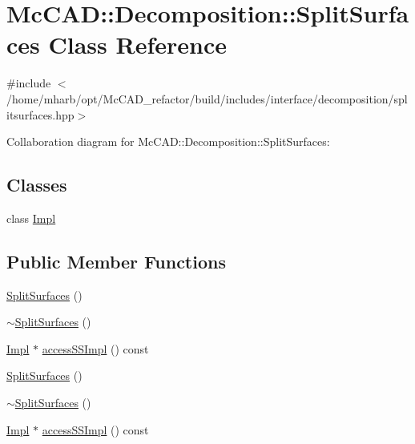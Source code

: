 \hypertarget{classMcCAD_1_1Decomposition_1_1SplitSurfaces}{}\section{Mc\+C\+AD\+:\+:Decomposition\+:\+:Split\+Surfaces Class Reference}
\label{classMcCAD_1_1Decomposition_1_1SplitSurfaces}


{\ttfamily \#include $<$/home/mharb/opt/\+Mc\+C\+A\+D\+\_\+refactor/build/includes/interface/decomposition/splitsurfaces.\+hpp$>$}



Collaboration diagram for Mc\+C\+AD\+:\+:Decomposition\+:\+:Split\+Surfaces\+:
\subsection*{Classes}
\begin{DoxyCompactItemize}
\item 
class \hyperlink{classMcCAD_1_1Decomposition_1_1SplitSurfaces_1_1Impl}{Impl}
\end{DoxyCompactItemize}
\subsection*{Public Member Functions}
\begin{DoxyCompactItemize}
\item 
\hyperlink{classMcCAD_1_1Decomposition_1_1SplitSurfaces_af0b06b75edbe1c2c45c2d8a3259b9985}{Split\+Surfaces} ()
\item 
\hyperlink{classMcCAD_1_1Decomposition_1_1SplitSurfaces_af963eef101d51ba4a0b1f112f29c5aa8}{$\sim$\+Split\+Surfaces} ()
\item 
\hyperlink{classMcCAD_1_1Decomposition_1_1SplitSurfaces_1_1Impl}{Impl} $\ast$ \hyperlink{classMcCAD_1_1Decomposition_1_1SplitSurfaces_a3b6480dcdde196aff297ded78b5391fc}{access\+S\+S\+Impl} () const
\item 
\hyperlink{classMcCAD_1_1Decomposition_1_1SplitSurfaces_af0b06b75edbe1c2c45c2d8a3259b9985}{Split\+Surfaces} ()
\item 
\hyperlink{classMcCAD_1_1Decomposition_1_1SplitSurfaces_af963eef101d51ba4a0b1f112f29c5aa8}{$\sim$\+Split\+Surfaces} ()
\item 
\hyperlink{classMcCAD_1_1Decomposition_1_1SplitSurfaces_1_1Impl}{Impl} $\ast$ \hyperlink{classMcCAD_1_1Decomposition_1_1SplitSurfaces_a2aaf6c8bee23bf628bc1c57da775a11e}{access\+S\+S\+Impl} () const
\end{DoxyCompactItemize}
